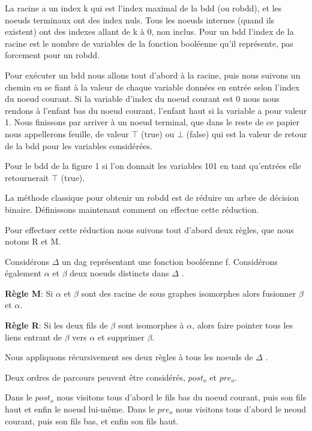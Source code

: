 \documentclass[french]{article}
\begin{document}
La racine a un index k qui est l'index maximal de la bdd (ou robdd), et les noeuds terminaux ont des index nuls. Tous les noeuds internes (quand ils existent) ont des indexes allant de k à 0, non inclus. Pour un bdd l'index de la racine est le nombre de variables de la fonction booléenne qu'il représente, pas forcement pour un robdd.

Pour exécuter un bdd nous allons tout d'abord à la racine, puis nous suivons un chemin en se fiant à la valeur de chaque variable données en entrée selon l'index du noeud courant. Si la variable d'index du noeud courant est 0 nous nous rendons à l'enfant bas du noeud courant, l'enfant haut si la variable a pour valeur 1. Nous finissons par arriver à un noeud terminal, que dans le reste de ce papier nous appellerons feuille, de valeur \(\top\) (true) ou \(\bot\) (false) qui est la valeur de retour de la bdd pour les variables considérées.

Pour le bdd de la figure 1 si l'on donnait les variables 101 en tant qu'entrées elle retournerait \(\top\) (true). 
\newpage

La méthode classique pour obtenir un robdd est de réduire un arbre de décision binaire. Définissons maintenant comment on effectue cette réduction.

Pour effectuer cette réduction nous suivons tout d'abord deux règles, que nous notons R et M.

Considérons \(\Delta\) un dag représentant une fonction booléenne f. Considérons également \(\alpha\) et \(\beta\)  deux noeuds distincts dans \(\Delta\) .

\textbf{Règle M}: Si \(\alpha\) et \(\beta\) sont des racine de sous graphes isomorphes alors fusionner \(\beta\) et \(\alpha\).

\textbf{Règle R}: Si les deux fils de \(\beta\) sont isomorphes à \(\alpha\), alors faire pointer tous les liens entrant de \(\beta\) vers \(\alpha\) et supprimer \(\beta\).

Nous appliquons récursivement ses deux règles à tous les noeuds de \(\Delta\) .
\vspace{5mm} %

Deux ordres de parcours peuvent être considérés, \(post_{o}\) et \(pre_{o}\).

Dans le \(post_{o}\) nous visitons tous d'abord le fils bas du noeud courant, puis son fils haut et enfin le noeud lui-même.
Dans le \(pre_{o}\) nous visitons tous d'abord le neoud courant, puis son fils bas, et enfin son fils haut.
\end{document}
